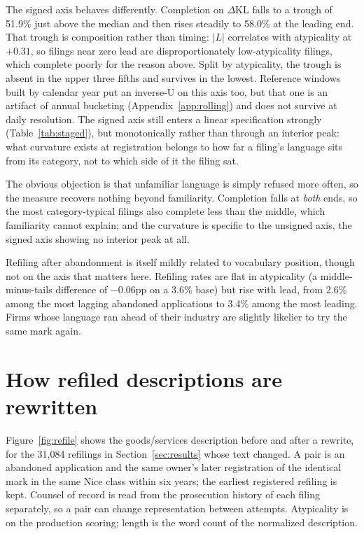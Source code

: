 \documentclass[11pt]{article}
\newcommand{\dkl}{$\Delta$KL}
\begin{document}
The signed axis behaves differently. Completion on \dkl{} falls to a trough of
51.9\% just above the median and then rises steadily to 58.0\% at the leading
end. That trough is composition rather than timing: $|L|$ correlates with
atypicality at $+0.31$, so filings near zero lead are disproportionately
low-atypicality filings, which complete poorly for the reason above. Split by
atypicality, the trough is absent in the upper three fifths and survives in
the lowest. Reference windows built by calendar year put an inverse-U on this
axis too, but that one is an artifact of annual bucketing
(Appendix~\ref{app:rolling}) and does not survive at daily resolution. The
signed axis still enters a linear specification strongly
(Table~\ref{tab:staged}), but monotonically rather than through an interior
peak: what curvature exists at registration belongs to how far a filing's
language sits from its category, not to which side of it the filing sat.

The obvious objection is that unfamiliar language is simply refused more
often, so the measure recovers nothing beyond familiarity. Completion falls at
\emph{both} ends, so the most category-typical filings also complete less than
the middle, which familiarity cannot explain; and the curvature is specific to
the unsigned axis, the signed axis showing no interior peak at all.

Refiling after abandonment is itself mildly related to vocabulary position,
though not on the axis that matters here. Refiling rates are flat in
atypicality (a middle-minus-tails difference of $-0.06$pp on a 3.6\% base) but
rise with lead, from 2.6\% among the most lagging abandoned applications to
3.4\% among the most leading. Firms whose language ran ahead of their industry
are slightly likelier to try the same mark again.

\section{How refiled descriptions are rewritten}\label{app:refile}

Figure~\ref{fig:refile} shows the goods/services description before and
after a rewrite, for the 31{,}084 refilings in Section~\ref{sec:results}
whose text changed. A pair is an abandoned application and the same owner's
later registration of the identical mark in the same Nice class within six
years; the earliest registered refiling is kept. Counsel of record is read
from the prosecution history of each filing separately, so a pair can change
representation between attempts. Atypicality is on the production scoring;
length is the word count of the normalized description.
\end{document}

